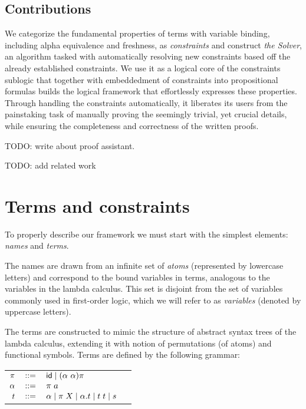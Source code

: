 \documentclass[english, mgr]{iithesis}
\renewcommand{\it}[1]{\textit{#1}}
\begin{document}
\section{Contributions}
We categorize the fundamental properties of terms with variable binding,
including alpha equivalence and freshness, as \it{constraints} and construct \it{the Solver},
an algorithm tasked with automatically resolving new constraints
based off the already established constraints.
We use it as a logical core of the constraints sublogic that together with embeddedment of constraints into propositional formulas builds the logical framework
that effortlessly expresses these properties.
Through handling the constraints automatically, it liberates its users from
the painstaking task of manually proving the seemingly trivial,
yet crucial details, while ensuring the completeness and correctness of the written proofs.

TODO: write about proof assistant.

TODO: add related work

\chapter{Terms and constraints}
To properly describe our framework we must start with the simplest elements:
\it{names} and \it{terms}.

The names are drawn from an infinite set of \it{atoms} (represented by lowercase letters)
and correspond to the bound variables in terms, analogous to the variables in the lambda calculus.
This set is disjoint from the set of variables commonly used in first-order logic,
which we will refer to as \it{variables} (denoted by uppercase letters).

The terms are constructed to mimic the structure of abstract syntax trees of the lambda calculus,
extending it with notion of permutations (of atoms) and functional symbols.
Terms are defined by the following grammar:
\\
\begin{tabular}{rclr}
    $\pi$    & $::=$ & $\mathsf{id} \mid (\alpha\ \alpha) \pi$ \\
    $\alpha$ & $::=$ & $\pi \; a$ \\
    $t$    & $::=$ & $\alpha \mid \pi \; X \mid \alpha. t \mid t \; t \mid s$
\end{tabular}
\\
\end{document}
